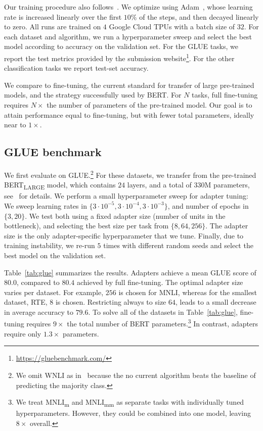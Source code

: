 Our training procedure also follows~\citet{devlin2018bert}.
We optimize using Adam~\citep{kingma2014adam}, whose learning rate is increased linearly over the first $10\%$ of the steps, and then decayed linearly to zero. All runs are trained on $4$ Google Cloud TPUs with a batch size of $32$. For each dataset and algorithm, we run a hyperparameter sweep and select the best model according to accuracy on the validation set. For the GLUE tasks, we report the test metrics provided by the submission website\footnote{\url{https://gluebenchmark.com/}}.
For the other classification tasks we report test-set accuracy.

We compare to fine-tuning, the current standard for transfer of large pre-trained models, and the strategy successfully used by BERT. For $N$ tasks, full fine-tuning requires $N{\times}$ the number of parameters of the pre-trained model. Our goal is to attain performance equal to fine-tuning, but with fewer total parameters, ideally near to $1{\times}$.

\subsection{GLUE benchmark\label{sec:glue}}

We first evaluate on GLUE.\footnote{
We omit WNLI as in~\citet{devlin2018bert} because the no current algorithm beats the baseline of predicting the majority class.} For these datasets, we transfer from the pre-trained BERT\textsubscript{LARGE} model, which contains $24$ layers, and a total of $330$M parameters, see~\citet{devlin2018bert} for details. We perform a small hyperparameter sweep for adapter tuning: We sweep learning rates in $\{3 \cdot 10^{-5}, 3 \cdot 10^{-4}, 3 \cdot 10^{-3}\}$, and number of epochs in $\{3, 20\}$.
We test both using a fixed adapter size (number of units in the bottleneck), and selecting the best size per task from $\{8, 64, 256\}$.
The adapter size is the only adapter-specific hyperparameter that we tune. Finally, due to training instability, we re-run $5$ times with different random seeds and select the best model on the validation set.

Table~\ref{tab:glue} summarizes the results. Adapters achieve a mean GLUE score of $80.0$, compared to $80.4$ achieved by full fine-tuning. The optimal adapter size varies per dataset. For example, $256$ is chosen for MNLI, whereas for the smallest dataset, RTE, $8$ is chosen. Restricting always to size $64$, leads to a small decrease in average accuracy to $79.6$. To solve all of the datasets in Table~\ref{tab:glue}, fine-tuning requires $9\times$ the total number of BERT parameters.\footnote{
We treat MNLI\textsubscript{m} and MNLI\textsubscript{mm} as separate tasks with individually tuned hyperparameters. However, they could be combined into one model, leaving $8\times$ overall.} In contrast, adapters require only $1.3\times$ parameters.

